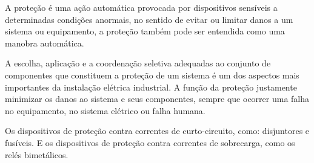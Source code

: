 A proteção é uma ação automática provocada por dispositivos sensíveis a determinadas condições anormais, no sentido de evitar ou limitar danos a um sistema ou equipamento, a proteção também pode ser entendida como uma manobra automática.

A escolha, aplicação e a coordenação seletiva adequadas ao conjunto de componentes que constituem a proteção de um sistema é um dos aspectos mais importantes da instalação elétrica industrial. A função da proteção justamente minimizar os danos ao sistema e seus componentes, sempre que ocorrer uma falha no equipamento, no sistema elétrico ou falha humana.

Os dispositivos de proteção contra correntes de curto-circuito, como: disjuntores e fusíveis. E os dispositivos de proteção contra correntes de sobrecarga, como os relés bimetálicos.